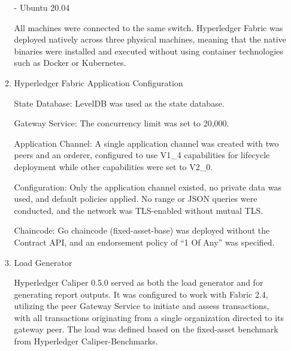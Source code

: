 \documentclass[conference]{IEEEtran}
\begin{document}
\begin{enumerate}[itemsep=2ex, parsep=1ex]
\begin{enumerate}[itemsep=2ex, parsep=1ex]
	      	      - Ubuntu 20.04
	      	      	      	      	      	      
	      	      All machines were connected to the same switch. Hyperledger Fabric was
	      	      deployed natively across three physical machines, meaning that the native
	      	      binaries were installed and executed without using container technologies
	      	      such as Docker or Kubernetes.
	      	      	      	      	      	      
	      	\item Hyperledger Fabric Application Configuration
	      	      	      	      	      	      
	      	      State Database: LevelDB was used as the state database.
	      	      	      	      	      	      
	      	      Gateway Service: The concurrency limit was set to 20,000.
	      	      	      	      	      	      
	      	      Application Channel: A single application channel was created with two
	      	      peers and an orderer, configured to use V1\_4 capabilities for lifecycle
	      	      deployment while other capabilities were set to V2\_0.
	      	      	      	      	      	      
	      	      Configuration: Only the application channel existed, no private data
	      	      was used, and default policies applied. No range or JSON queries were
	      	      conducted, and the network was TLS-enabled without mutual TLS.
	      	      	      	      	      	      
	      	      Chaincode: Go chaincode (fixed-asset-base) was deployed without the
	      	      Contract API, and an endorsement policy of “1 Of Any” was specified.
	      	      	      	      	      	      
	      	\item Load Generator
	      	      	      	      	      	      
	      	      Hyperledger Caliper 0.5.0 served as both the load generator and for generating
	      	      report outputs. It was configured to work with Fabric 2.4, utilizing the
	      	      peer Gateway Service to initiate and assess transactions, with all
	      	      transactions originating from a single organization directed to its
	      	      gateway peer. The load was defined based on the fixed-asset benchmark from
	      	      Hyperledger Caliper-Benchmarks.
	      	      	      	      	      	      

\end{enumerate}
\end{enumerate}
\end{document}
